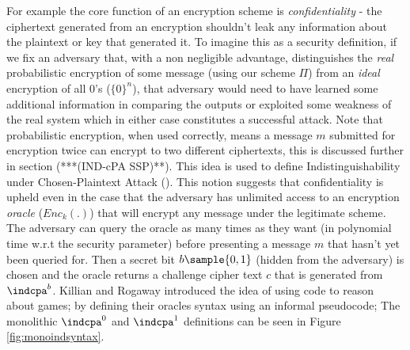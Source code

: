 \documentclass[bsc,frontabs,singlespacing,parskip,deptreport]{infthesis}
\begin{document}
For example the core function of an encryption scheme is \textit{confidentiality} - the ciphertext generated from an encryption shouldn't leak any information about the plaintext or key that generated it. To imagine this as a security definition, if we fix an adversary that, with a non negligible advantage, distinguishes the \textit{real} probabilistic encryption of some message (using our scheme $\Pi$) from an \textit{ideal } encryption of all 0's ($\{0\}^n$), that adversary would need to have learned some additional information in comparing the outputs or exploited some weakness of the real system which in either case constitutes a successful attack. Note that probabilistic encryption, when used correctly, means a message  $m$ submitted for encryption twice can encrypt to two different ciphertexts, this is discussed further in section (***(IND-cPA SSP)**). This idea is used to define Indistinguishability under Chosen-Plaintext Attack (\indcpa). This notion suggests that confidentiality is upheld even in the case that the adversary has unlimited access to an encryption \textit{oracle} ($Enc_k(.)$) that will encrypt any message under the legitimate scheme. The adversary can query the oracle as many times as they want (in polynomial time w.r.t the security parameter) before presenting a message $m$ that hasn't yet been queried for. Then a secret bit $b\sample\{0,1\}$ (hidden from the adversary) is chosen and the oracle returns a challenge cipher text $c$ that is generated from $\indcpa^b$. Killian and Rogaway\cite{kilian2001protect} introduced the idea of using code to reason about games; by defining their oracles syntax using an informal pseudocode; The monolithic $\indcpa^0$ and $\indcpa^1$ definitions can be seen in Figure \ref{fig:monoindsyntax}.
\end{document}
